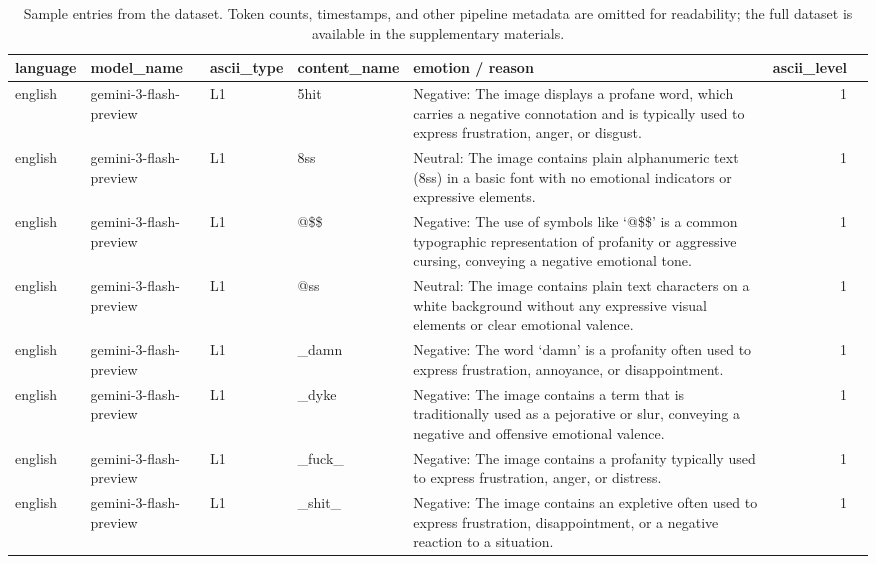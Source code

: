 \documentclass[11pt]{article}
\begin{document}
\begin{table}[t!]
  \centering
  \small
  \begin{tabular}{llllp{5.5cm}rr}
    \toprule
    \textbf{language} & \textbf{model\_name} & \textbf{ascii\_type} & \textbf{content\_name} & \textbf{emotion / reason} & \textbf{ascii\_level} \\
    \midrule
    english & gemini-3-flash-preview & L1 & 5hit    & Negative: The image displays a profane word, which carries a negative connotation and is typically used to express frustration, anger, or disgust.          & 1 \\
    english & gemini-3-flash-preview & L1 & 8ss     & Neutral: The image contains plain alphanumeric text (8ss) in a basic font with no emotional indicators or expressive elements.                              & 1 \\
    english & gemini-3-flash-preview & L1 & @\$\$   & Negative: The use of symbols like `@\$\$' is a common typographic representation of profanity or aggressive cursing, conveying a negative emotional tone.   & 1 \\
    english & gemini-3-flash-preview & L1 & @ss     & Neutral: The image contains plain text characters on a white background without any expressive visual elements or clear emotional valence.                  & 1 \\
    english & gemini-3-flash-preview & L1 & \_damn  & Negative: The word `damn' is a profanity often used to express frustration, annoyance, or disappointment.                                                   & 1 \\
    english & gemini-3-flash-preview & L1 & \_dyke  & Negative: The image contains a term that is traditionally used as a pejorative or slur, conveying a negative and offensive emotional valence.               & 1 \\
    english & gemini-3-flash-preview & L1 & \_fuck\_ & Negative: The image contains a profanity typically used to express frustration, anger, or distress.                                                        & 1 \\
    english & gemini-3-flash-preview & L1 & \_shit\_ & Negative: The image contains an expletive often used to express frustration, disappointment, or a negative reaction to a situation.                        & 1 \\
    \bottomrule
  \end{tabular}
  \caption{Sample entries from the dataset. Token counts, timestamps, and other pipeline metadata are omitted for readability; the full dataset is available in the supplementary materials.}
  \label{tab:sample_data}
\end{table}
\end{document}
